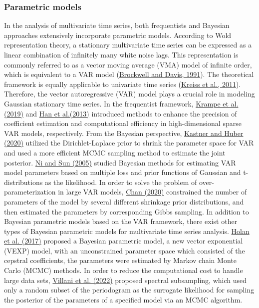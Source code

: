\documentclass[12pt,a4paper]{article}
\begin{document}
\subsubsection{Parametric models}
In the analysis of multivariate time series, both frequentists and Bayesian approaches extensively incorporate parametric models. According to Wold representation theory, a stationary multivariate time series can be expressed as a linear combination of infinitely many white noise lags. This representation is commonly referred to as a vector moving average (VMA) model of infinite order, which is equivalent to a VAR model (\hyperref[BD1991]{Brockwell and Davis, 1991}). The theoretical framework is equally applicable to univariate time series (\hyperref[Kreiss2011]{Kreiss et al., 2011}). Therefore, the vector autoregressive (VAR) model plays a crucial role in modeling Gaussian stationary time series. In the frequentist framework, \hyperref[Krampe2019]{Krampe et al.(2019)} and \hyperref[han2013]{Han et al.(2013)} introduced methods to enhance the precision of coefficient estimation and computational efficiency in high-dimensional sparse VAR models, respectively. From the Bayesian perspective, \hyperref[kastner2020]{Kastner and Huber (2020)} utilized the Dirichlet-Laplace prior to shrink the parameter space for VAR and used a more efficient MCMC sampling method to estimate the joint posterior. \hyperref[ni2005]{Ni and Sun (2005)} studied Bayesian methods for estimating VAR model parameters based on multiple loss and prior functions of Gaussian and t-distributions as the likelihood. In order to solve the problem of over-parameterization in large VAR models, \hyperref[chan2020]{Chan (2020)} constrained the number of parameters of the model by several different shrinkage prior distributions, and then estimated the parameters by corresponding Gibbs sampling. In addition to Bayesian parametric models based on the VAR framework, there exist other types of Bayesian parametric models for multivariate time series analysis. \hyperref[Holand 2017]{Holan et al. (2017)} proposed a Bayesian parametric model, a new vector exponential (VEXP) model, with an unconstrained parameter space which consisted of the cepstral coefficients, the parameters were estimated by Markov chain Monte Carlo (MCMC) methods. In order to reduce the computational cost to handle large data sets, \hyperref[Villani (2022)]{Villani et al. (2022)} proposed spectral subsampling, which used only a random subset of the periodogram as the surrogate likelihood for sampling the posterior of the parameters of a specified model via an MCMC algorithm. 
\end{document}

